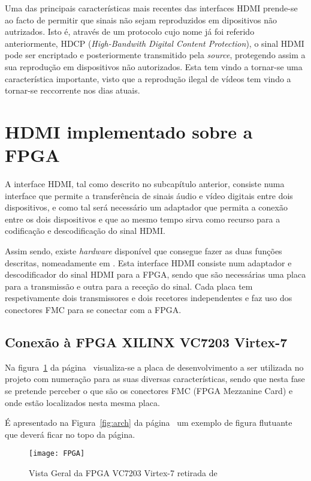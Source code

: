 Uma das principais características mais recentes das interfaces HDMI prende-se ao facto de permitir que sinais não sejam reproduzidos em dipositivos não autrizados. Isto é, através de um protocolo cujo nome já foi referido anteriormente, HDCP (\textit{High-Bandwith Digital Content Protection}), o sinal HDMI pode ser encriptado e posteriormente transmitido pela \textit{source}, protegendo assim a sua reprodução em dispositivos não autorizados. Esta tem vindo a tornar-se uma característica importante, visto que a reprodução ilegal de vídeos tem vindo a tornar-se reccorrente nos dias atuais.

\section{HDMI implementado sobre a FPGA}
A interface HDMI, tal como descrito no subcapítulo anterior, consiste numa interface que permite a transferência de sinais áudio e vídeo digitais entre dois dispositivos, e como tal será necessário um adaptador que permita a conexão entre os dois dispositivos e que ao mesmo tempo sirva como recurso para a codificação e descodificação do sinal HDMI. 

Assim sendo, existe \textit{hardware} disponível que consegue fazer as duas funções descritas, nomeadamente em \cite{R009}. Esta interface HDMI consiste num adaptador e descodificador do sinal HDMI para a FPGA, sendo que são necessárias uma placa para a transmissão e outra para a receção do sinal. Cada placa tem respetivamente dois transmissores e dois recetores independentes e faz uso dos conectores FMC para se conectar com a FPGA.

\subsection{Conexão à FPGA XILINX VC7203 Virtex-7} \label{batik} 
Na figura~\ref{fig:fpgaVistaGeral} da página~\pageref{fig:fpgaVistaGeral}  visualiza-se a placa de desenvolvimento a ser utilizada no projeto com numeração para as suas diversas características, sendo que nesta fase se pretende perceber o que são os conectores FMC (FPGA Mezzanine Card) e onde estão localizados nesta mesma placa.

É apresentado na Figura~\ref{fig:arch} da página~\pageref{fig:arch} um
exemplo de figura flutuante que deverá ficar no topo da página.

\begin{figure}[t]
	\begin{center}
		\leavevmode
		\texttt{[image: FPGA]}
		\caption{Vista Geral da FPGA VC7203 Virtex-7 retirada de \cite{R008}}
		\label{fig:fpgaVistaGeral}
	\end{center}
\end{figure}